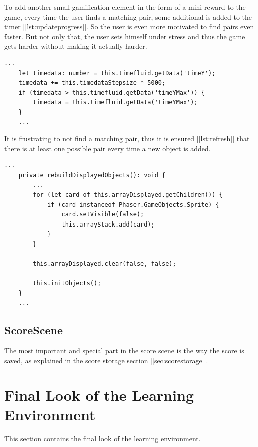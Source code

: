 To add another small gamification element in the form of a mini reward to the game, every time the user finds a matching
pair, some additional is added to the timer [\ref{lst:updateprogress}]. So the user is even more motivated to find pairs even faster.
But not only that, the user sets himself under stress and thus the game gets harder without making it actually harder.

\begin{lstlisting}[style=TypeScript, caption={updateProgressbar (gameScene.ts)}, label={lst:updateprogress}]
    ...
    let timedata: number = this.timefluid.getData('timeY');
    timedata += this.timedataStepsize * 5000;
    if (timedata > this.timefluid.getData('timeYMax')) {
        timedata = this.timefluid.getData('timeYMax');
    }
    ...
\end{lstlisting}

It is frustrating to not find a matching pair, thus
it is ensured [\ref{lst:refresh}] that there is at least one possible pair every time a new object is added.

\begin{lstlisting}[style=TypeScript, caption={Refreshing the current set of objects (gameScene.ts)}, label={lst:refresh}]
    ...
    private rebuildDisplayedObjects(): void {
        ...
        for (let card of this.arrayDisplayed.getChildren()) {
            if (card instanceof Phaser.GameObjects.Sprite) {
                card.setVisible(false);
                this.arrayStack.add(card);
            }
        }

        this.arrayDisplayed.clear(false, false);

        this.initObjects();
    }
    ...
\end{lstlisting}

\subsection{ScoreScene}\label{subsec:scorescene}
The most important and special part in the score scene is the way the score is saved,
as explained in the score storage section [\ref{sec:scorestorage}].

\section{Final Look of the Learning Environment}\label{sec:final-look-of-the-learning-environment}
This section contains the final look of the learning environment.


